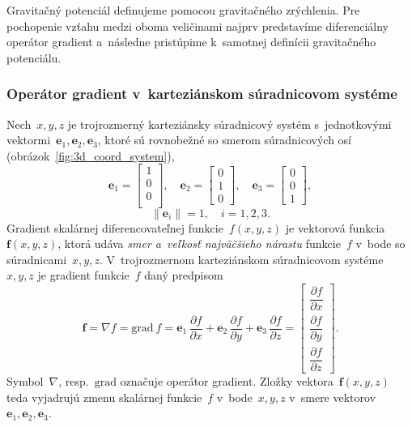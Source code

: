 \documentclass[a4paper, 12pt]{book}
\newcommand{\grad}{\mathrm{grad}}
\let\vec\mathbf
\begin{document}
Gravitačný potenciál definujeme pomocou gravitačného zrýchlenia.  Pre 
pochopenie vzťahu medzi oboma veličinami najprv predstavíme diferenciálny 
operátor gradient a~následne pristúpime k~samotnej definícii gravitačného 
potenciálu.

\subsubsection{Operátor gradient v~karteziánskom súradnicovom systéme}
\label{sec:gradient}

Nech~$x, y, z$ je trojrozmerný karteziánsky súradnicový systém s~jednotkovými 
vektormi~$\vec e_1, \vec e_2, \vec e_3$, ktoré sú rovnobežné so smerom 
súradnicových osí (obrázok~\ref{fig:3d_coord_system}),
%
\begin{equation}
\label{eq:unit_vectors}
\vec e_1 =
\begin{bmatrix}
1\\
0\\
0\\
\end{bmatrix}
{,} \quad
%
\vec e_2 =
\begin{bmatrix}
0\\
1\\
0
\end{bmatrix}
%
{,}\quad
%
\vec e_3 =
\begin{bmatrix}
0\\
0\\
1
\end{bmatrix}
{,}
\end{equation}
%
\begin{equation}
\label{eq:unit_vectors_unit_length}
\| \vec e_i \| = 1{,} \quad i = 1, 2,3{.}
\end{equation}
%
Gradient skalárnej diferencovateľnej funkcie~$f(x, y, z)$ je vektorová 
funkcia~$\vec f(x, y, z)$, ktorá udáva \emph{smer a~veľkosť najväčšieho 
nárastu} funkcie~$f$ v~bode so súradnicami~$x, y, z$.  V~trojrozmernom 
karteziánskom súradnicovom systéme~$x, y, z$ je gradient funkcie~$f$ daný 
predpisom
%
\begin{equation}
\label{eq:gradient}
\vec f = \nabla f = \grad \ f = \vec e_1 \, \frac{\partial f}{\partial x} 
+ \vec e_2 \, \frac{\partial
f}{\partial y} + \vec e_3 \, \frac{\partial f}{\partial z} =
\begin{bmatrix}
\dfrac{\partial f}{\partial x}\\[2ex]
\dfrac{\partial f}{\partial y}\\[2ex]
\dfrac{\partial f}{\partial z}
\end{bmatrix}
{.}
\end{equation}
%
Symbol~$\nabla$, resp.~$\grad$ označuje operátor gradient.  Zložky 
vektora~$\vec f(x, y, z)$ teda vyjadrujú zmenu skalárnej funkcie~$f$ v~bode~$x, 
y, z$ v~smere vektorov~$\vec e_1, \vec e_2, \vec e_3$.
\end{document}
